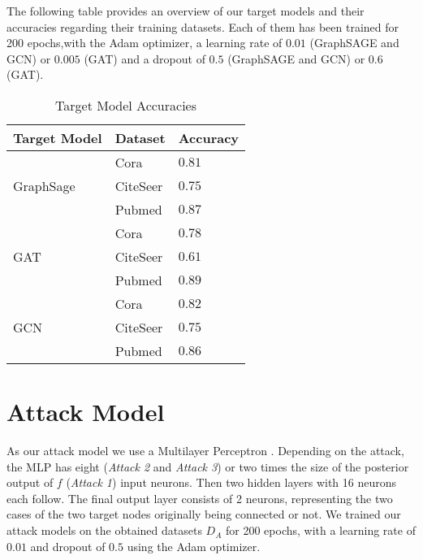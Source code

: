     The following table provides an overview of our target models and their accuracies regarding their training datasets.
    Each of them has been trained for 200 epochs,with the Adam optimizer, a learning rate of $0.01$ (GraphSAGE and GCN) or $0.005$ (GAT) and a dropout of $0.5$ (GraphSAGE and GCN) or $0.6$ (GAT). 
    \vspace{0.48cm}
    \begin{table}[!h]
      \centering
      \footnotesize
      \begin{tabular}{l|l|l}
        \toprule
        Target Model & Dataset & Accuracy \\
        \midrule
          \multirow{3}{4em}{GraphSage} & Cora & $0.81$ \\
          & CiteSeer & $0.75$ \\
          & Pubmed & $0.87$ \\

          \multirow{3}{4em}{GAT} & Cora & $0.78$ \\
          & CiteSeer & $0.61$ \\
          & Pubmed & $0.89$ \\

          \multirow{3}{4em}{GCN} & Cora & $0.82$ \\
          & CiteSeer & $0.75$ \\
          & Pubmed & $0.86$ \\
          
        \bottomrule
      \end{tabular}
      \caption{Target Model Accuracies}
      \label{table:target-models}
    \end{table}

  \section{Attack Model}
    As our attack model we use a Multilayer Perceptron .
    Depending on the attack, the MLP has eight (\emph{Attack 2} and \emph{Attack 3}) or two times the size of the posterior output of $f$ (\emph{Attack 1}) input neurons.
    Then two hidden layers with 16 neurons each follow.
    The final output layer consists of 2 neurons, representing the two cases of the two target nodes originally being connected or not.
    We trained our attack models on the obtained datasets $D_A$ for 200 epochs, with a learning rate of $0.01$ and dropout of $0.5$ using the Adam optimizer.

